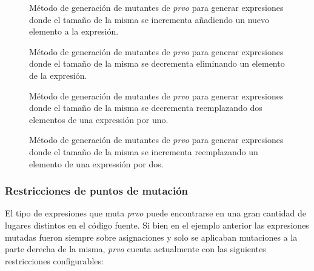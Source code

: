 \begin{figure}
	
	\caption{M\'etodo de generaci\'on de mutantes de \emph{prvo} para generar expresiones donde el tama\~no de la misma se incrementa a\~nadiendo un nuevo elemento a la expresi\'on.}
	\label{figures.code.prvoMethods.increaseLength}
\end{figure}

\begin{figure}
	
	\caption{M\'etodo de generaci\'on de mutantes de \emph{prvo} para generar expresiones donde el tama\~no de la misma se decrementa eliminando un elemento de la expresi\'on.}
	\label{figures.code.prvoMethods.decreaseLength}
\end{figure}

\begin{figure}
	
	\caption{M\'etodo de generaci\'on de mutantes de \emph{prvo} para generar expresiones donde el tama\~no de la misma se decrementa reemplazando dos elementos de una expressi\'on por uno.}
	\label{figures.code.prvoMethods.twoByOne}
\end{figure}

\begin{figure}
	
	\caption{M\'etodo de generaci\'on de mutantes de \emph{prvo} para generar expresiones donde el tama\~no de la misma se incrementa reemplazando un elemento de una expressi\'on por dos.}
	\label{figures.code.prvoMethods.oneByTwo}
\end{figure}

\subsubsection{Restricciones de puntos de mutaci\'on}

El tipo de expresiones que muta \emph{prvo} puede encontrarse en una gran cantidad de lugares distintos en el c\'odigo fuente. Si bien en el ejemplo anterior las expresiones mutadas fueron siempre sobre asignaciones y solo se aplicaban mutaciones a la parte derecha de la misma, \emph{prvo} cuenta actualmente con las siguientes restricciones configurables:

